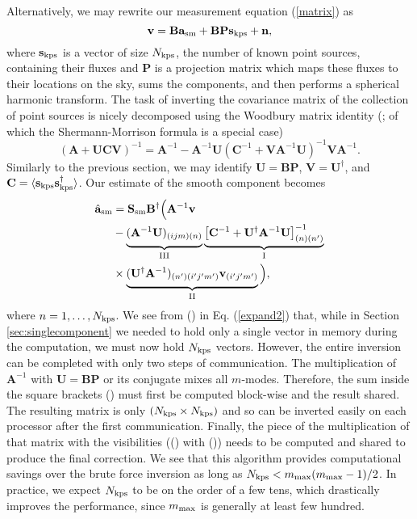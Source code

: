 Alternatively, we may rewrite our measurement equation (\ref{matrix}) as
\begin{equation}
\mathbf{v} =\mathbf{B}\mathbf{a}_{\rm sm} + \mathbf{B}\mathbf{P}\mathbf{s}_{\rm kps}  + \mathbf{n},
\end{equation}
where $\mathbf{s}_{\rm kps}$ is a vector of size $N_{\rm kps}$, the number of known point sources, containing their fluxes and $\mathbf{P}$ is a projection matrix which maps these fluxes to their locations on the sky, sums the components, and then performs a spherical harmonic transform. The task of inverting the covariance matrix of the collection of point sources is nicely decomposed using the Woodbury matrix identity (\citealp{woodbury}; of which the Shermann-Morrison formula is a special case)
\begin{equation}
(\mathbf{A}+\mathbf{U}\mathbf{C}\mathbf{V})^{-1}=\mathbf{A}^{-1}-\mathbf{A}^{-1}\mathbf{U}(\mathbf{C}^{-1}+\mathbf{V}\mathbf{A}^{-1}\mathbf{U})^{-1}\mathbf{V}\mathbf{A}^{-1}.
\label{woodbury}
\end{equation}
Similarly to the previous section, we may identify $\mathbf{U} = \mathbf{B}\mathbf{P}$, $\mathbf{V} = \mathbf{U}^\dagger$, and $\mathbf{C} = \langle \mathbf{s}_{\rm kps}\mathbf{s}_{\rm kps}^{\dagger} \rangle$. Our estimate of the smooth component becomes
\begin{align}
\hat{\mathbf{a}}_{\rm sm} &=  \mathbf{S}_{\rm sm}\mathbf{B}^{\dagger}\Big( \mathbf{A}^{-1}\mathbf{v}
\nonumber \\
 &-  \underbrace{\vphantom{\big]^{-1}_{(n)(n')}}(\mathbf{A}^{-1}\mathbf{U})_{(ijm)(n)}}_{\text{\RNum{3}}}
 \underbrace{\big[\mathbf{C}^{-1}
+\mathbf{U}^\dagger\mathbf{A}^{-1}\mathbf{U}\big]^{-1}_{(n)(n')}}_{\text{\RNum{1}}}
\nonumber \\
&\times
\underbrace{\vphantom{\big]^{-1}_{(n)(n')}}(\mathbf{U}^{\dagger}\mathbf{A}^{-1})_{(n')(i'j'm')}\mathbf{v}_{(i'j'm')}}_{\text{\RNum{2}}} \Big),
\label{expand2}
\end{align}
where $n=1,\dots,N_{\rm kps}$. We see from () in Eq. (\ref{expand2}) that, while in Section \ref{sec:singlecomponent} we needed to hold only a single vector in memory during the computation, we must now hold $N_{\rm kps}$ vectors. However, the entire inversion can be completed with only two steps of communication. The multiplication of $\mathbf{A}^{-1}$ with $\mathbf{U}=\mathbf{B}\mathbf{P}$ or its conjugate mixes all $m$-modes. Therefore, the sum inside the square brackets () must first be computed block-wise and the result shared. The resulting matrix is only $(N_{\rm kps} \times N_{\rm kps})$ and so can be inverted easily on each processor after the first communication. Finally, the piece of the multiplication of that matrix with the visibilities (() with ()) needs to be computed and shared to produce the final correction. We see that this algorithm provides computational savings over the brute force inversion as long as $N_{\rm kps} < m_{\rm max}(m_{\rm max} - 1)/2$. In practice, we expect $N_{\rm kps}$ to be on the order of a few tens, which drastically improves the performance, since $m_{\rm max}$ is generally at least few hundred.
